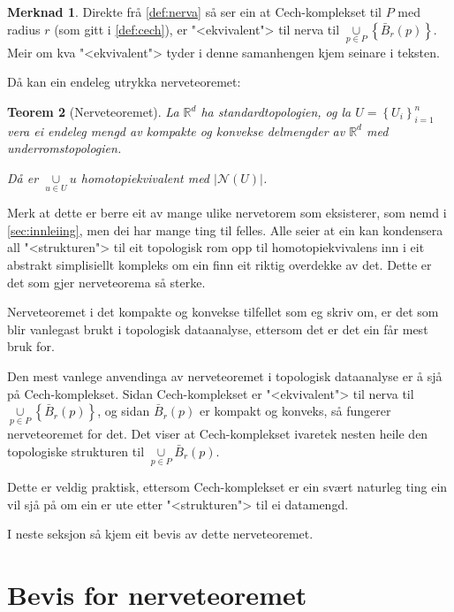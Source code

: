 \documentclass[a4paper, 12pt, norsk]{article}
\theoremstyle{plain}
\newtheorem{theorem}{Teorem}[section]
\theoremstyle{definition}
\newtheorem{remark}[theorem]{Merknad}
\newcommand{\Rb}{\mathbb{R}}
\newcommand{\Nc}{\mathcal{N}}
\newcommand{\union}{ \mathop{\cup}\limits }
\newcommand{\gr}[1]{ \lvert #1 \rvert } %
\newcommand{\set}[1]{ \left\{ #1 \right\} } %
\begin{document}
\begin{remark} \label{rem:cech-ekvivalent}
	Direkte frå \autoref{def:nerva} så ser ein at Cech-komplekset til $P$ med radius $r$ (som gitt i \autoref{def:cech}), er "<ekvivalent"> til nerva til $\union_{p \in P} \left \{ \bar{B}_r(p) \right \}$. Meir om kva "<ekvivalent"> tyder i denne samanhengen kjem seinare i teksten.
\end{remark}

Då kan ein endeleg utrykka nerveteoremet:

\begin{theorem}[Nerveteoremet] \label{thm:nerveteoremet}
	La \( \Rb^d \) ha standardtopologien, og la \( U = \set{U_i}_{i=1}^n \) vera ei endeleg mengd av kompakte og konvekse delmengder av \( \Rb^d \) med underromstopologien.
	
	Då er \( \union_{u \in U} u \) homotopiekvivalent med \( \gr{\Nc(U)} \).
\end{theorem}

Merk at dette er berre eit av mange ulike nervetorem som eksisterer, som nemd i \autoref{sec:innleiing}, men dei har mange ting til felles. Alle seier at ein kan kondensera all "<strukturen"> til eit topologisk rom opp til homotopiekvivalens inn i eit abstrakt simplisiellt kompleks om ein finn eit riktig overdekke av det. Dette er det som gjer nerveteorema så sterke.

Nerveteoremet i det kompakte og konvekse tilfellet som eg skriv om, er det som blir vanlegast brukt i topologisk dataanalyse, ettersom det er det ein får mest bruk for.

Den mest vanlege anvendinga av nerveteoremet i topologisk dataanalyse er å sjå på Cech-komplekset. Sidan Cech-komplekset er "<ekvivalent"> til nerva til \( \union_{p \in P} \left \{ \bar{B}_r(p) \right \} \), og sidan \( \bar{B}_r(p) \) er kompakt og konveks, så fungerer nerveteoremet for det. Det viser at Cech-komplekset ivaretek nesten heile den topologiske strukturen til \( \union_{p \in P} \bar{B}_r(p) \).

Dette er veldig praktisk, ettersom Cech-komplekset er ein svært naturleg ting ein vil sjå på om ein er ute etter "<strukturen"> til ei datamengd.

I neste seksjon så kjem eit bevis av dette nerveteoremet.

\section{Bevis for nerveteoremet}
\end{document}
